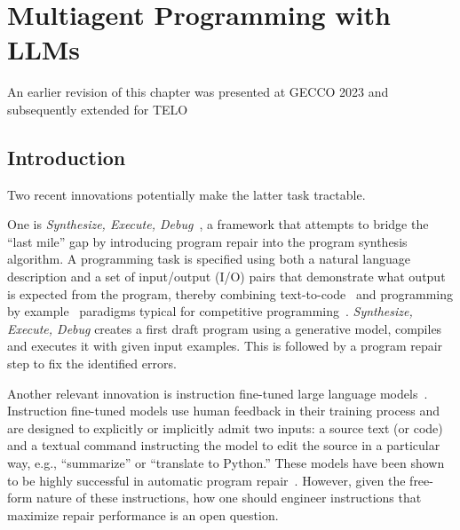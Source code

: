 \chapter{Multiagent Programming with LLMs}
\label{ch:seidr}
\begin{remark}
  An earlier revision of this chapter was presented at GECCO 2023 \cite{liventsevFullyAutonomousProgramming2023} and subsequently extended for TELO \cite{grishinaFullyAutonomousProgramming2025}
\end{remark}

\section{Introduction}
\label{sec:seidr-intro}

Two recent innovations potentially make the latter task tractable.

One is \emph{Synthesize, Execute, Debug}~\cite{guptaSynthesizeExecuteDebug2020}, a framework that attempts to bridge the ``last mile'' gap by introducing program repair into the program synthesis algorithm. 
A programming task is specified using both a natural language description and a set of input/output (I/O) pairs that demonstrate what output is expected from the program, thereby combining text-to-code~\cite{iyer2018:mapping} and programming by example~\cite{halbertProgrammingExample1984,gulwani2016:programming} paradigms typical for competitive programming~\cite{zavershynskyi2018:naps}.
\emph{Synthesize, Execute, Debug} creates a first draft program using a generative model, compiles and executes it with given input examples.
This is followed by a program repair step to fix the identified errors.

Another relevant innovation is instruction fine-tuned large language models~\cite{zhang2024:instruction}. 
Instruction fine-tuned models use human feedback \cite{chaudhariRLHFDecipheredCritical2024, kaufmannSurveyReinforcementLearning2024} in their training process and are designed to explicitly or implicitly admit two inputs: a source text (or code) and a textual command instructing the model to edit the source in a particular way, e.g., ``summarize'' or ``translate to Python.''
These models have been shown to be highly successful in automatic program repair~\cite{fanAutomatedRepairPrograms2023}. 
However, given the free-form nature of these instructions, how one should engineer instructions that maximize repair performance is an open question. 

